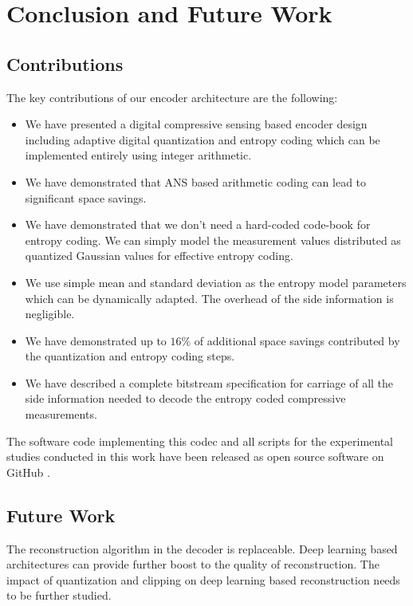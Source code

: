 \section{Conclusion and Future Work}
\label{sec:conclusion}

\subsection{Contributions}

The key contributions of our encoder architecture are the following:

\begin{itemize}
    \item We have presented a digital compressive sensing based encoder
    design including adaptive digital quantization
    and entropy coding which can be
    implemented entirely using integer arithmetic.
    \item We have demonstrated that ANS based arithmetic coding can
    lead to significant space savings.
    \item We have demonstrated that we don't need a hard-coded
    code-book for entropy coding. We can simply model the
    measurement values distributed as quantized Gaussian values
    for effective entropy coding.
    \item We use simple mean and standard deviation as the entropy model
    parameters which can be dynamically adapted. The overhead of
    the side information is negligible.
    \item We have demonstrated up to $16\%$ of additional space
    savings contributed by the quantization and entropy coding steps.
    \item We have described a complete bitstream specification for
    carriage of all the side information needed to decode the
    entropy coded compressive measurements.
\end{itemize}

The software code implementing this codec
and all scripts for the experimental studies conducted
in this work have been released as open source software
on GitHub \cite{kumar2022ecgcodec}.

\subsection{Future Work}

The reconstruction algorithm in the decoder is replaceable.
Deep learning based architectures can provide further boost
to the quality of reconstruction. The impact of quantization
and clipping on deep learning based reconstruction needs
to be further studied.

